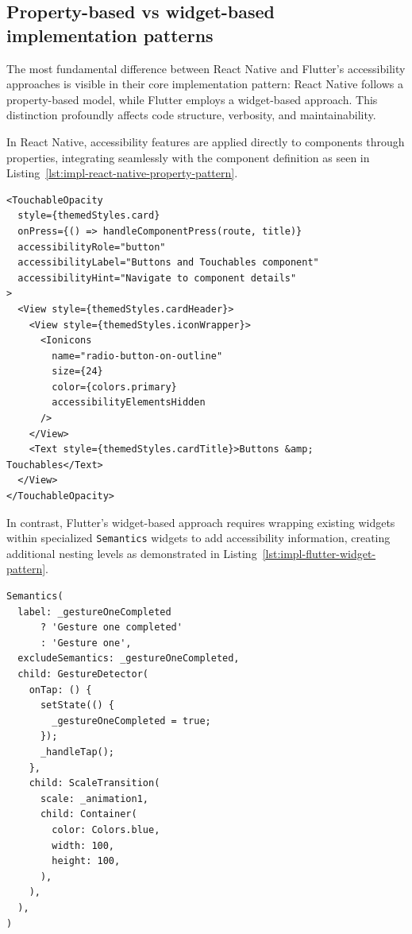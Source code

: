 \subsection{Property-based vs widget-based implementation patterns}
\label{subsec:property-widget-patterns}

The most fundamental difference between React Native and Flutter's accessibility approaches is visible in their core implementation pattern: React Native follows a property-based model, while Flutter employs a widget-based approach. This distinction profoundly affects code structure, verbosity, and maintainability.

In React Native, accessibility features are applied directly to components through properties, integrating seamlessly with the component definition as seen in Listing~\ref{lst:impl-react-native-property-pattern}.

\begin{lstlisting}[style=ReactNativeStyle, caption=Property-based accessibility pattern in React Native, label=lst:impl-react-native-property-pattern]
<TouchableOpacity
  style={themedStyles.card}
  onPress={() => handleComponentPress(route, title)}
  accessibilityRole="button"
  accessibilityLabel="Buttons and Touchables component"
  accessibilityHint="Navigate to component details"
>
  <View style={themedStyles.cardHeader}>
    <View style={themedStyles.iconWrapper}>
      <Ionicons
        name="radio-button-on-outline"
        size={24}
        color={colors.primary}
        accessibilityElementsHidden
      />
    </View>
    <Text style={themedStyles.cardTitle}>Buttons &amp; Touchables</Text>
  </View>
</TouchableOpacity>
\end{lstlisting}

\FloatBarrier

In contrast, Flutter's widget-based approach requires wrapping existing widgets within specialized \texttt{Semantics} widgets to add accessibility information, creating additional nesting levels as demonstrated in Listing~\ref{lst:impl-flutter-widget-pattern}.

\begin{lstlisting}[style=DartStyle, caption=Widget-based accessibility pattern in Flutter, label=lst:impl-flutter-widget-pattern]
Semantics(
  label: _gestureOneCompleted 
      ? 'Gesture one completed' 
      : 'Gesture one',
  excludeSemantics: _gestureOneCompleted,
  child: GestureDetector(
    onTap: () {
      setState(() {
        _gestureOneCompleted = true;
      });
      _handleTap();
    },
    child: ScaleTransition(
      scale: _animation1,
      child: Container(
        color: Colors.blue,
        width: 100,
        height: 100,
      ),
    ),
  ),
)
\end{lstlisting}

